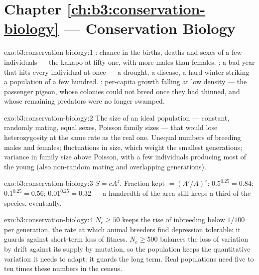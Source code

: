 \section*{Chapter \ref{ch:b3:conservation-biology} --- Conservation Biology}

\begin{solution}{exo:b3:conservation-biology:1}
: chance in the births, deaths and sexes of a
few individuals --- the kakapo at fifty-one, with more males than
females. : a bad year that hits every
individual at once --- a drought, a disease, a hard winter striking a
population of a few hundred. : per-capita growth falling
at low density --- the passenger pigeon, whose colonies could not breed
once they had thinned, and whose remaining predators were no longer
swamped.
\end{solution}

\begin{solution}{exo:b3:conservation-biology:2}
The size of an ideal population --- constant, randomly mating, equal
sexes, Poisson family sizes --- that would lose heterozygosity at the
same rate as the real one. Unequal numbers of breeding males and
females; fluctuations in size, which weight the smallest generations;
variance in family size above Poisson, with a few individuals
producing most of the young (also non-random mating and overlapping
generations).
\end{solution}

\begin{solution}{exo:b3:conservation-biology:3}
$S = cA^{z}$. Fraction kept $= (A'/A)^{z}$: $0.5^{0.25} = 0.84$;
$0.1^{0.25} = 0.56$; $0.01^{0.25} = 0.32$ --- a hundredth of the area
still keeps a third of the species, eventually.
\end{solution}

\begin{solution}{exo:b3:conservation-biology:4}
$N_{e} \ge 50$ keeps the rise of inbreeding below $1/100$ per
generation, the rate at which animal breeders find depression
tolerable: it guards against short-term loss of fitness. $N_{e} \ge
500$ balances the loss of variation by drift against its supply by
mutation, so the population keeps the quantitative variation it needs
to adapt: it guards the long term. Real populations need five to ten
times these numbers in the census.
\end{solution}

